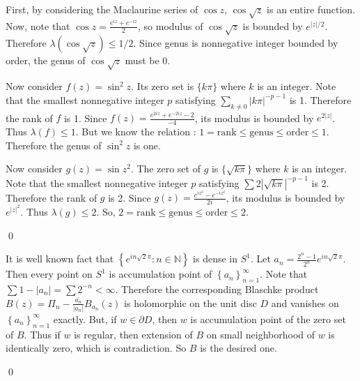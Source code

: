 \begin{problem}[9.1] \hfill

	First, by considering the Maclaurine series of $\cos z$, $\cos \sqrt{z}$ is an entire function.
	Now, note that $\cos z = \frac{e^{iz} + e^{-iz}}{2}$, so modulus of $\cos \sqrt{z}$ is bounded by $e^{|z|/2}$.
	Therefore $\lambda(\cos \sqrt{z}) \leq 1/2$. Since genus is nonnegative integer bounded by order, the genus of $\cos \sqrt{z}$ must be 0.

	Now consider $f(z) = \sin^2 z$. Its zero set is $\{ k\pi \}$ where $k$ is an integer.
	Note that the smallest nonnegative integer $p$ satisfying $\sum_{k \ne 0} |k\pi|^{-p-1}$ is 1.
	Therefore the rank of $f$ is 1.
	Since $f(z) = \frac{e^{2iz} + e^{-2iz} -2}{-4}$, its modulus is bounded by $e^{2|z|}$.
	Thus $\lambda(f) \leq 1$.
	But we know the relation : $1= \text{rank} \leq \text{genus} \leq \text{order} \leq 1$.
	Therefore the genus of $\sin^2 z$ is one.

	Now consider $g(z) = \sin z^2$.
	The zero set of $g$ is $\{ \sqrt{k \pi} \}$ where $k$ is an integer.
	Note that the smallest nonnegative integer $p$ satisfying $\sum 2 |\sqrt{k \pi} |^{-p -1}$ is 2.
	Therefore the rank of $g$ is 2.
	Since $g(z) = \frac{e^{iz^2} - e^{-iz^2}}{2i}$, its modulus is bounded by $e^{|z|^2}$.
	Thus $\lambda(g) \leq 2$.
	So, $2 = \text{rank} \leq \text{genus} \leq \text{order} \leq 2$.
	
	\qed

\end{problem}

\begin{problem}[9.2] \hfill

	It is well known fact that $\left\{ e^{in\sqrt{2} \pi} : n \in \mathbb{N} \right\}$ is dense in $S^1$. 
	Let $a_n = \frac{2^n -1}{2^n} e^{in \sqrt{2} \pi}$.
	Then every point on $S^1$ is accumulation point of $\left\{ a_n \right\}_{n=1}^{\infty}$.
	Note that $\sum 1-|a_n| = \sum 2^{-n} < \infty$.
	Therefore the corresponding Blaschke product $B(z) = \Pi _n -\frac{\bar{a_n}}{|a_n|}B_{a_n}(z)$ is holomorphic on the unit disc $D$ and vanishes on $\left\{ a_n \right\}_{n=1}^\infty$ exactly.
	But, if $w \in \partial D$, then $w$ is accumulation point of the zero set of $B$.
	Thus if $w$ is regular, then extension of $B$ on small neighborhood of $w$ is identically zero, which is contradiction.
	So $B$ is the desired one.

	\qed
	
\end{problem}

